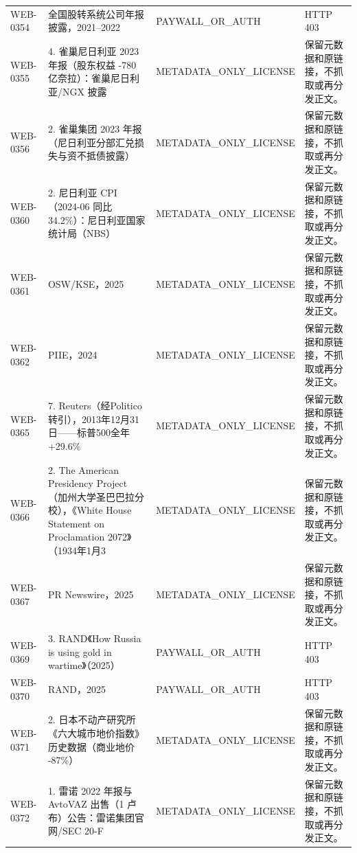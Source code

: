 \documentclass[UTF8,openany,oneside,11pt]{ctexbook}
\begin{document}
\begin{longtable}{L{1.5cm}L{5.5cm}L{3cm}L{5cm}}
WEB-\allowbreak{}0354 & 全国股转系统公司年报披露，2021–2022 & PAYWALL\_\allowbreak{}OR\_\allowbreak{}AUTH & HTTP 403 \\
WEB-\allowbreak{}0355 & 4. 雀巢尼日利亚 2023 年报（股东权益 -\allowbreak{}780 亿奈拉）：雀巢尼日利亚/\allowbreak{}NGX 披露 & METADATA\_\allowbreak{}ONLY\_\allowbreak{}LICENSE & 保留元数据和原链接，不抓取或再分发正文。 \\
WEB-\allowbreak{}0356 & 2. 雀巢集团 2023 年报（尼日利亚分部汇兑损失与资不抵债披露） & METADATA\_\allowbreak{}ONLY\_\allowbreak{}LICENSE & 保留元数据和原链接，不抓取或再分发正文。 \\
WEB-\allowbreak{}0360 & 2. 尼日利亚 CPI（2024-\allowbreak{}06 同比 34.2\%）：尼日利亚国家统计局（NBS） & METADATA\_\allowbreak{}ONLY\_\allowbreak{}LICENSE & 保留元数据和原链接，不抓取或再分发正文。 \\
WEB-\allowbreak{}0361 & OSW/\allowbreak{}KSE，2025 & METADATA\_\allowbreak{}ONLY\_\allowbreak{}LICENSE & 保留元数据和原链接，不抓取或再分发正文。 \\
WEB-\allowbreak{}0362 & PIIE，2024 & METADATA\_\allowbreak{}ONLY\_\allowbreak{}LICENSE & 保留元数据和原链接，不抓取或再分发正文。 \\
WEB-\allowbreak{}0365 & 7. Reuters（经Politico转引），2013年12月31日——标普500全年+29.6\% & METADATA\_\allowbreak{}ONLY\_\allowbreak{}LICENSE & 保留元数据和原链接，不抓取或再分发正文。 \\
WEB-\allowbreak{}0366 & 2. The American Presidency Project（加州大学圣巴巴拉分校），《White House Statement on Proclamation 2072》（1934年1月3 & METADATA\_\allowbreak{}ONLY\_\allowbreak{}LICENSE & 保留元数据和原链接，不抓取或再分发正文。 \\
WEB-\allowbreak{}0367 & PR Newswire，2025 & METADATA\_\allowbreak{}ONLY\_\allowbreak{}LICENSE & 保留元数据和原链接，不抓取或再分发正文。 \\
WEB-\allowbreak{}0369 & 3. RAND《How Russia is using gold in wartime》（2025） & PAYWALL\_\allowbreak{}OR\_\allowbreak{}AUTH & HTTP 403 \\
WEB-\allowbreak{}0370 & RAND，2025 & PAYWALL\_\allowbreak{}OR\_\allowbreak{}AUTH & HTTP 403 \\
WEB-\allowbreak{}0371 & 2. 日本不动产研究所《六大城市地价指数》历史数据（商业地价 -\allowbreak{}87\%） & METADATA\_\allowbreak{}ONLY\_\allowbreak{}LICENSE & 保留元数据和原链接，不抓取或再分发正文。 \\
WEB-\allowbreak{}0372 & 1. 雷诺 2022 年报与 AvtoVAZ 出售（1 卢布）公告：雷诺集团官网/\allowbreak{}SEC 20-\allowbreak{}F & METADATA\_\allowbreak{}ONLY\_\allowbreak{}LICENSE & 保留元数据和原链接，不抓取或再分发正文。 \\

\end{longtable}
\end{document}
